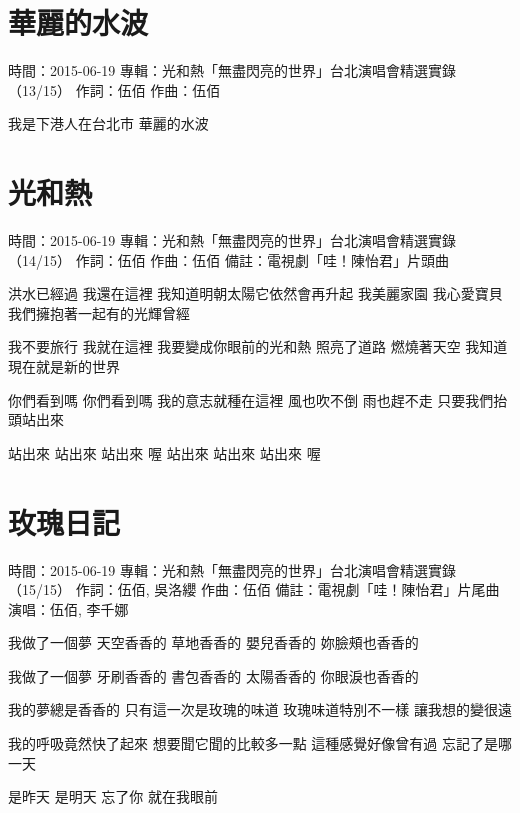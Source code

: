 \documentclass[UTF8,a4paper,oneside,twocolumn,12pt]{ctexbook}
\newcommand{\infopair}[2]{\textbullet #1：#2}
\newcommand{\zc}[1][伍佰]{\infopair{作詞}{#1}}
\newcommand{\zq}[1][伍佰]{\infopair{作曲}{#1}}
\newcommand{\zj}[1]{\infopair{專輯}{#1}}
\newcommand{\sj}[1]{\infopair{時間}{#1}}
\newcommand{\bz}[1]{\infopair{備註}{#1}}
\newenvironment{info}{\begin{flushleft}\kaishu
	}
	{\end{flushleft}\normalsize\yahei\par}
\newenvironment{lyric}{
	}
{}
\begin{document}
\section{華麗的水波}
\begin{info}
	\sj{2015-06-19}
	\zj{光和熱「無盡閃亮的世界」台北演唱會精選實錄（13/15）}
	\zc
	\zq
\end{info}
\begin{lyric}
	我是下港人在台北市
	華麗的水波
\end{lyric}

\section{光和熱}
\begin{info}
	\sj{2015-06-19}
	\zj{光和熱「無盡閃亮的世界」台北演唱會精選實錄（14/15）}
	\zc
	\zq
	\bz{電視劇「哇！陳怡君」片頭曲}
\end{info}
\begin{lyric}
	洪水已經過  我還在這裡
	我知道明朝太陽它依然會再升起
	我美麗家園  我心愛寶貝
	我們擁抱著一起有的光輝曾經

	我不要旅行  我就在這裡
	我要變成你眼前的光和熱
	照亮了道路  燃燒著天空
	我知道現在就是新的世界

	你們看到嗎   你們看到嗎
	我的意志就種在這裡
	風也吹不倒  雨也趕不走
	只要我們抬頭站出來

	站出來  站出來  站出來  喔
	站出來  站出來  站出來  喔
\end{lyric}

\section{玫瑰日記}
\begin{info}
	\sj{2015-06-19}
	\zj{光和熱「無盡閃亮的世界」台北演唱會精選實錄（15/15）}
	\zc[伍佰, 吳洛纓]
	\zq
	\bz{電視劇「哇！陳怡君」片尾曲}
	\infopair{演唱}{伍佰, 李千娜}
\end{info}
\begin{lyric}
	我做了一個夢
	天空香香的  草地香香的
	嬰兒香香的  妳臉頰也香香的

	我做了一個夢
	牙刷香香的  書包香香的
	太陽香香的  你眼淚也香香的

	我的夢總是香香的
	只有這一次是玫瑰的味道
	玫瑰味道特別不一樣
	讓我想的變很遠

	我的呼吸竟然快了起來
	想要聞它聞的比較多一點
	這種感覺好像曾有過
	忘記了是哪一天

	是昨天  是明天
	忘了你  就在我眼前
\end{lyric}
\end{document}
